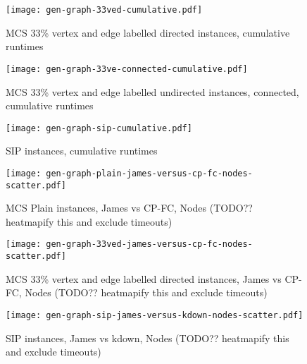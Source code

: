 \documentclass[letterpaper]{article}
\begin{document}
\begin{figure}
    \centering
    \texttt{[image: gen-graph-33ved-cumulative.pdf]}
    \caption{MCS 33\% vertex and edge labelled directed instances, cumulative runtimes}\label{figure:33ved-cumulative}
\end{figure}

\begin{figure}
    \centering
    \texttt{[image: gen-graph-33ve-connected-cumulative.pdf]}
    \caption{MCS 33\% vertex and edge labelled undirected instances, connected, cumulative runtimes}\label{figure:33ve-connected-cumulative}
\end{figure}

\begin{figure}
    \centering
    \texttt{[image: gen-graph-sip-cumulative.pdf]}
    \caption{SIP instances, cumulative runtimes}\label{figure:sip-cumulative}
\end{figure}

\begin{figure}
    \centering
    \texttt{[image: gen-graph-plain-james-versus-cp-fc-nodes-scatter.pdf]}
    \caption{MCS Plain instances, James vs CP-FC, Nodes (TODO?? heatmapify this
    and exclude timeouts)}\label{figure:plain-james-versus-cp-fc-nodes-scatter}
\end{figure}

\begin{figure}
    \centering
    \texttt{[image: gen-graph-33ved-james-versus-cp-fc-nodes-scatter.pdf]}
    \caption{MCS 33\% vertex and edge labelled directed instances, James vs
    CP-FC, Nodes (TODO?? heatmapify this and exclude
    timeouts)}\label{figure:33ved-james-versus-cp-fc-nodes-scatter}
\end{figure}

\begin{figure}
    \centering
    \texttt{[image: gen-graph-sip-james-versus-kdown-nodes-scatter.pdf]}
    \caption{SIP instances, James vs kdown, Nodes (TODO?? heatmapify this and exclude
    timeouts)}\label{figure:sip-james-versus-kdown-nodes-scatter}
\end{figure}



\end{document}
